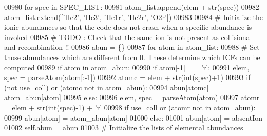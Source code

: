 \begin{DoxyCode}
00980             \textcolor{keywordflow}{for} spec \textcolor{keywordflow}{in} SPEC\_LIST:
00981                 atom\_list.append(elem + str(spec)) 
00982         atom\_list.extend([\textcolor{stringliteral}{'He2'}, \textcolor{stringliteral}{'He3'}, \textcolor{stringliteral}{'He1r'}, \textcolor{stringliteral}{'He2r'}, \textcolor{stringliteral}{'O2r'}])
00983     
00984         \textcolor{comment}{# Initialize the ionic abundances so that the code does not crash when a specific abundance is
       invoked}
00985         \textcolor{comment}{# TODO : Check that the same ion is not present as collisional and recombination !!}
00986         abun = \{\}
00987         \textcolor{keywordflow}{for} atom \textcolor{keywordflow}{in} atom\_list:
00988             \textcolor{comment}{# Set those abundances which are different from 0. These determine which ICFs can be computed  
            }
00989             \textcolor{keywordflow}{if} atom \textcolor{keywordflow}{in} atom\_abun:
00990                 \textcolor{keywordflow}{if} atom[-1] == \textcolor{stringliteral}{'}\textcolor{stringliteral}{r':}
00991 \textcolor{stringliteral}{                    elem, spec = \hyperlink{namespacepyneb_1_1utils_1_1misc_a8c069186002a3e73dd474958e35034d5}{parseAtom}(atom[:-1])}
00992 \textcolor{stringliteral}{                    atomc = elem + str(int(spec)+1)}
00993 \textcolor{stringliteral}{                    }\textcolor{keywordflow}{if} (\textcolor{keywordflow}{not} use\_coll) \textcolor{keywordflow}{or} (atomc \textcolor{keywordflow}{not} \textcolor{keywordflow}{in} atom\_abun):
00994                         abun[atomc] = atom\_abun[atom]
00995                 \textcolor{keywordflow}{else}:
00996                     elem, spec = \hyperlink{namespacepyneb_1_1utils_1_1misc_a8c069186002a3e73dd474958e35034d5}{parseAtom}(atom)
00997                     atomr = elem + str(int(spec)-1) + \textcolor{stringliteral}{'}\textcolor{stringliteral}{r'}
00998 \textcolor{stringliteral}{                    }\textcolor{keywordflow}{if} use\_coll \textcolor{keywordflow}{or} (atomr \textcolor{keywordflow}{not} \textcolor{keywordflow}{in} atom\_abun):
00999                         abun[atom] = atom\_abun[atom]
01000             \textcolor{keywordflow}{else}:
01001                 abun[atom] = absentIon
\hypertarget{classpyneb_1_1core_1_1icf_1_1_i_c_f_l01002}{}\hyperlink{classpyneb_1_1core_1_1icf_1_1_i_c_f_a16f31533c8f77e2b08988b22df5317b1}{01002}         self.\hyperlink{classpyneb_1_1core_1_1icf_1_1_i_c_f_a16f31533c8f77e2b08988b22df5317b1}{abun} = abun
01003         \textcolor{comment}{# Initialize the lists of elemental abundances}

\end{DoxyCode}
